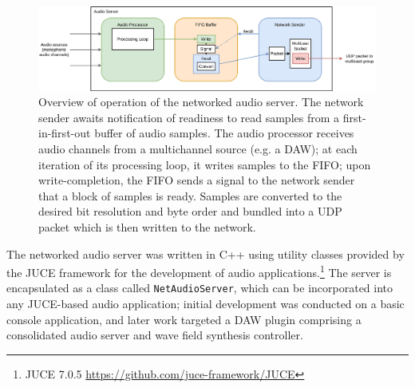 \documentclass[utf8]{FrontiersinHarvard}
\begin{document}
    \begin{figure}[ht]
        \centering
        \includegraphics[width=\textwidth]{figures/audio-server}
        \caption{Overview of operation of the networked audio server.
        The network sender awaits notification of readiness to read samples from a
        first-in-first-out buffer of audio samples.
        The audio processor receives audio channels from a multichannel source
            (e.g. a DAW); at each iteration of its processing loop, it writes
            samples to the FIFO; upon write-completion, the FIFO sends a signal to
            the network sender that a block of samples is ready.
            Samples are converted to the desired bit resolution and byte order and
            bundled into a UDP packet which is then written to the network.}
        \label{fig:audio-server}
    \end{figure}

    The networked audio server was written in C++ using utility classes provided by
    the JUCE framework for the development of audio applications.\footnote{
        JUCE 7.0.5 \url{https://github.com/juce-framework/JUCE}
    }
    The server is encapsulated as a class called \texttt{NetAudioServer},
    which can be incorporated into any JUCE-based audio application;
    initial development was conducted on a basic console application, and later work
    targeted a DAW plugin comprising a consolidated audio server and wave field
    synthesis controller.
\end{document}
